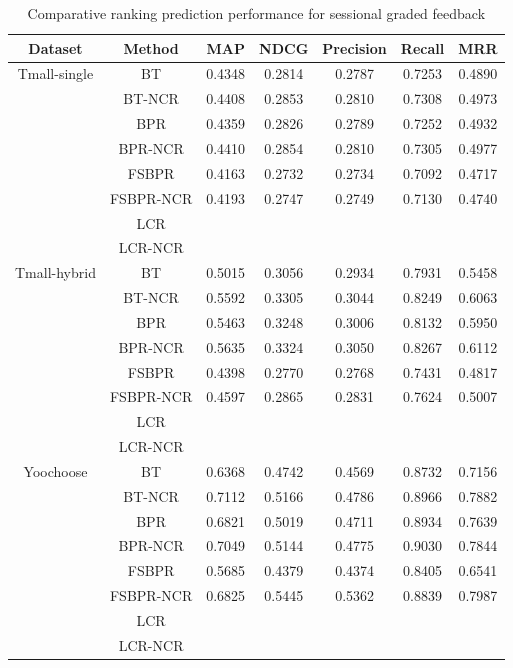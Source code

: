 \documentclass[letterpaper]{article} %
\begin{document}
\begin{table}[htp]
\tiny
\caption{Comparative ranking prediction performance for sessional graded feedback}
\begin{center}
\begin{tabular}{|c|c|c|c|c|c|c|}
\hline
Dataset & Method & MAP & NDCG & Precision & Recall & MRR \\\hline
\multirow{6}{*}{Tmall-single} & BT &0.4348 &0.2814 &0.2787 &0.7253 &0.4890 \\\cline{2-7}
 & BT-NCR &0.4408 &0.2853 &0.2810 &0.7308 &0.4973 \\\cline{2-7}
 & BPR &0.4359 &0.2826 &0.2789 &0.7252 &0.4932 \\\cline{2-7}
 & BPR-NCR &0.4410 &0.2854 &0.2810 &0.7305 &0.4977 \\\cline{2-7}
 & FSBPR &0.4163 &0.2732 &0.2734 &0.7092 &0.4717 \\\cline{2-7}
  & FSBPR-NCR &0.4193 &0.2747 &0.2749 &0.7130 &0.4740 \\\cline{2-7}
   & LCR & & & & & \\\cline{2-7}
 & LCR-NCR & & & & & \\\hline
\multirow{6}{*}{Tmall-hybrid} & BT &0.5015 &0.3056 &0.2934 &0.7931 &0.5458 \\\cline{2-7}
 & BT-NCR &0.5592 &0.3305 &0.3044 &0.8249 &0.6063 \\\cline{2-7}
 & BPR &0.5463 &0.3248 &0.3006 &0.8132 &0.5950 \\\cline{2-7}
 & BPR-NCR &0.5635 &0.3324 &0.3050 &0.8267 &0.6112 \\\cline{2-7}
 & FSBPR &0.4398 &0.2770 &0.2768 &0.7431 &0.4817 \\\cline{2-7}
  & FSBPR-NCR &0.4597 &0.2865 &0.2831 &0.7624 &0.5007 \\\cline{2-7}
   & LCR & & & & & \\\cline{2-7}
 & LCR-NCR & & & & & \\\hline
\multirow{6}{*}{Yoochoose} & BT &0.6368 &0.4742 &0.4569 &0.8732 &0.7156 \\\cline{2-7}
 & BT-NCR &0.7112 &0.5166 &0.4786 &0.8966 &0.7882 \\\cline{2-7}
 & BPR &0.6821 &0.5019 &0.4711 &0.8934 &0.7639 \\\cline{2-7}
 & BPR-NCR &0.7049 &0.5144 &0.4775 &0.9030 &0.7844 \\\cline{2-7}
 & FSBPR &0.5685 &0.4379 &0.4374 &0.8405 &0.6541\\\cline{2-7}
  & FSBPR-NCR &0.6825 &0.5445 &0.5362 &0.8839 &0.7987  \\\cline{2-7}
   & LCR & & & & & \\\cline{2-7}
 & LCR-NCR & & & & & \\\hline
\end{tabular}
\end{center}
\label{tab:gradedresult}
\end{table}%
\end{document}
